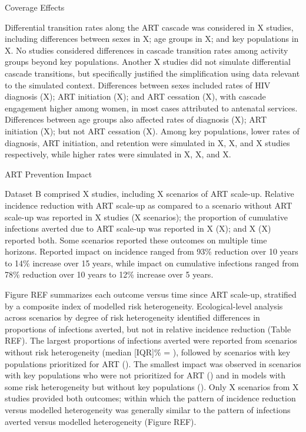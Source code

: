 Coverage Effects

Differential transition rates along the ART cascade was considered in
X studies, including differences between
sexes in X;
age groups in X; and
key populations in X.
No studies considered differences in cascade transition rates
among activity groups beyond key populations. 
Another X studies did not simulate differential cascade transitions,
but specifically justified the simplification using data relevant to the simulated context.
Differences between sexes included rates of
HIV diagnosis (X);
ART initiation (X); and
ART cessation (X),
with cascade engagement higher among women,
in most cases attributed to antenatal services.
Differences between age groups also affected
rates of diagnosis (X);
ART initiation (X);
but not ART cessation (X). 
Among key populations, lower rates of
diagnosis, ART initiation, and retention were simulated in
X, X, and X
studies respectively, while higher rates were simulated in
X, X, and X.

ART Prevention Impact

Dataset B comprised X studies,
including X scenarios of ART scale-up.
Relative incidence reduction with ART scale-up
as compared to a scenario without ART scale-up
was reported in X studies (X scenarios);
the proportion of cumulative infections averted due to ART scale-up
was reported in X (X);
and X (X) reported both.
Some scenarios reported these outcomes on multiple time horizons.
Reported impact on incidence ranged from 
93\% reduction over 10 years to
14\% increase over 15 years,
while impact on cumulative infections ranged from
78\% reduction over 10 years to
12\% increase over 5 years.

Figure REF summarizes each outcome versus time since ART scale-up,
stratified by a composite index of modelled risk heterogeneity.
Ecological-level analysis across scenarios by degree of risk heterogeneity
identified differences in proportions of infections averted,
but not in relative incidence reduction (Table REF).
The largest proportions of infections averted were reported from 
scenarios without risk heterogeneity 
(median [IQR]\% = ), followed by scenarios
with key populations prioritized for ART ().
The smallest impact was observed in scenarios with
key populations who were not prioritized for ART ()
and in models with some risk heterogeneity but without key populations
().
Only X scenarios from X studies provided both outcomes; 
within which the pattern of incidence reduction versus modelled heterogeneity
was generally similar to the pattern of infections averted versus modelled heterogeneity
(Figure REF).

